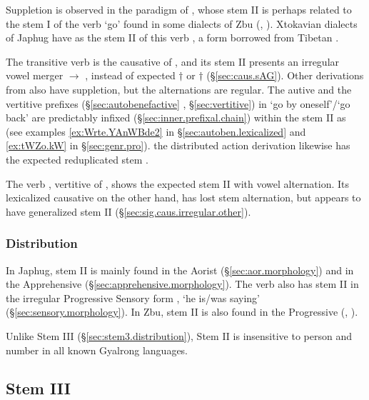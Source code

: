 Suppletion is observed in the paradigm of , whose stem II  is perhaps related to the stem I of the verb `go' found in some dialects of Zbu (, \citealt[274]{jackson04showu}). Xtokavian dialects of Japhug have  as the stem II of this verb \citep{linluo03}, a form borrowed from Tibetan .

The transitive verb  is the causative of  , and its stem II presents an irregular vowel merger  $\rightarrow$ , instead of expected $\dagger$ or $\dagger$ (§\ref{sec:caus.sAG}). Other derivations from  also have suppletion, but the alternations are regular. The autive and the vertitive  prefixes (§\ref{sec:autobenefactive} , §\ref{sec:vertitive}) in  `go by oneself'/`go back' are predictably infixed (§\ref{sec:inner.prefixal.chain}) within the stem II  as   (see examples \ref{ex:Wrte.YAnWBde2} in §\ref{sec:autoben.lexicalized} and \ref{ex:tWZo.kW} in §\ref{sec:genr.pro}). the distributed action derivation  likewise has the expected reduplicated stem .
 
The verb , vertitive of , shows the expected stem II  with vowel alternation. Its lexicalized causative  on the other hand, has lost stem alternation, but appears to have generalized stem II (§\ref{sec:sig.caus.irregular.other}).

 \subsubsection{Distribution} \label{sec:stem2.distribution}
 In Japhug, stem II is mainly found in the Aorist (§\ref{sec:aor.morphology})  and in the Apprehensive (§\ref{sec:apprehensive.morphology}). The verb    also has stem II  in the irregular Progressive Sensory form  ,  `he is/was saying' (§\ref{sec:sensory.morphology}). In Zbu, stem II is also found in the Progressive (\citealt{jackson00sidaba}, \citealt[196]{gong18these}).
 
 Unlike Stem III (§\ref{sec:stem3.distribution}), Stem II is insensitive to person and number in all known Gyalrong languages.
 
\subsection{Stem III}  \label{sec:stem3}

